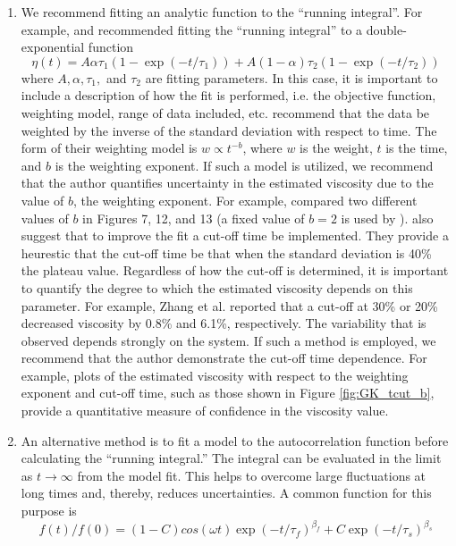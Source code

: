 \documentclass[9pt]{livecoms}
\begin{document}
\begin{enumerate}
\begin{enumerate}
		\item We recommend fitting an analytic function to the ``running integral''. For example, \cite{ReyCastro2006} and \cite{Zhang2015} recommended fitting the ``running integral'' to a double-exponential function \begin{equation}
		\eta(t) = A \alpha \tau_1 \left(1-\exp{(-t/\tau_1)}\right) + A (1-\alpha) \tau_2 \left(1-\exp{(-t/\tau_2)}\right)
		\end{equation}
		where $A, \alpha, \tau_1, $ and $\tau_2$ are fitting parameters. In this case, it is important to include a description of how the fit is performed, i.e. the objective function, weighting model, range of data included, etc. \cite{Zhang2015} recommend that the data be weighted by the inverse of the standard deviation with respect to time. The form of their weighting model is $w \propto t^{-b}$, where $w$ is the weight, $t$ is the time, and $b$ is the weighting exponent. If such a model is utilized, we recommend that the author quantifies uncertainty in the estimated viscosity due to the value of $b$, the weighting exponent. For example, \cite{Zhang2015} compared two different values of $b$ in Figures 7, 12, and 13 (a fixed value of $b=2$ is used by \cite{ReyCastro2006}). \cite{Zhang2015} also suggest that to improve the fit a cut-off time be implemented. They provide a heurestic that the cut-off time be that when the standard deviation is 40\% the plateau value. Regardless of how the cut-off is determined, it is important to quantify the degree to which the estimated viscosity depends on this parameter. For example, Zhang et al. reported that a cut-off at 30\% or 20\% decreased viscosity by 0.8\% and 6.1\%, respectively. The variability that is observed depends strongly on the system. If such a method is employed, we recommend that the author demonstrate the cut-off time dependence. For example, plots of the estimated viscosity with respect to the weighting exponent and cut-off time, such as those shown in Figure \ref{fig:GK_tcut_b}, provide a quantitative measure of confidence in the viscosity value.
		\item An alternative method is to fit a model to the autocorrelation function before calculating the ``running integral.'' The integral can be evaluated in the limit as $t \to \infty$ from the model fit. This helps to overcome large fluctuations at long times and, thereby, reduces uncertainties. A common function for this purpose is
		\begin{equation} \label{eq:ACF_fit}
		f(t)/f(0) = (1-C)cos(\omega t)\exp{(-t/\tau_f)^{\beta_f}} + C\exp{(-t/\tau_s)^{\beta_s}}

\end{equation}
\end{enumerate}
\end{enumerate}
\end{document}
